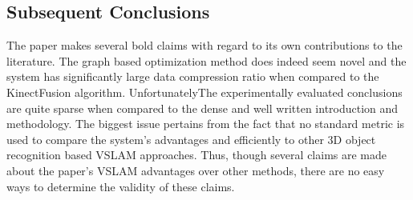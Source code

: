 \documentclass[10pt,twocolumn,letterpaper]{article}
\begin{document}
\subsection{Subsequent Conclusions}
The paper makes several bold claims with regard to its own contributions to the literature. The graph based optimization method does indeed seem novel and the system has significantly large data compression ratio when compared to the KinectFusion algorithm. UnfortunatelyThe experimentally evaluated conclusions are quite sparse when compared to the dense and well written introduction and methodology. The biggest issue pertains from the fact that no standard metric is used to compare the system's advantages and efficiently to other 3D object recognition based VSLAM approaches. Thus, though several claims are made about the paper's VSLAM advantages over other methods, there are no easy ways to determine the validity of these claims.
\end{document}
